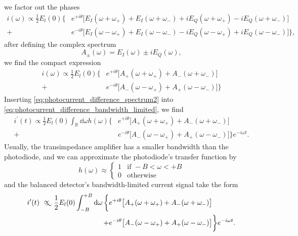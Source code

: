 we factor out the phases
\begin{align*}
    i(\omega)
    \propto
    \frac{1}{2}
    E_l(0)
    \biggl\{
        &e^{+i\theta}
        \bigl[
            E_I(\omega+\omega_+)+E_I(\omega+\omega_-)+iE_Q(\omega+\omega_+)-iE_Q(\omega+\omega_-)
        \bigr]\\
        +
        &e^{-i\theta}
        \bigl[
            E_I(\omega-\omega_+)+E_I(\omega-\omega_-)-iE_Q(\omega-\omega_+)+iE_Q(\omega-\omega_-)
        \bigr]
    \biggr\},
\end{align*}
after defining the complex spectrum
\begin{equation}
    A_\pm(\omega)
    =
    E_I(\omega)\pm iE_Q(\omega)
    \label{eq:aux_spectrum},
\end{equation}
we find the compact expression
\begin{align}
    i(\omega)
    \propto
    \frac{1}{2}E_l(0)
    \biggl\{
        &e^{+i\theta}
        \bigl[
            A_+(\omega+\omega_+)+A_-(\omega+\omega_-)
        \bigr]\\
        +
        &e^{-i\theta}
        \bigl[
            A_-(\omega-\omega_+)+A_+(\omega-\omega_-)
        \bigr]
    \biggr\}
\end{align}
Inserting \cref{eq:photocurrent_difference_spectrum2} into \cref{eq:photocurrent_difference_bandwidth_limited}, we find
\begin{align}
    i^\prime(t)
    \propto
    \frac{1}{2}E_l(0)
    \int_\mathbb{R}\dd{\omega}
    h(\omega)
    \biggl\{
        &e^{+i\theta}
        \bigl[
            A_+(\omega+\omega_+)+A_-(\omega+\omega_-)
        \bigr]\\
        +
        &e^{-i\theta}
        \bigl[
            A_-(\omega-\omega_+)+A_+(\omega-\omega_-)
        \bigr]
    \biggr\}
    e^{-i\omega t}
    \label{eq:photocurrent_difference_spectrum3}.
\end{align}
Usually, the transimpedance amplifier has a smaller bandwidth than the photodiode, and we can approximate the photodiode's transfer function by
\begin{equation}
    h(\omega)
    \approx
    \begin{cases}
        1 & \text{if } -B<\omega<+B\\
        0 & \text{otherwise}
    \end{cases}
\end{equation}
and the balanced detector's bandwidth-limited current signal take the form
\begin{align}
    i^\prime(t)
    \approxprop
    \frac{1}{2}
    E_l(0)
    \int_{-B}^{+B}\dd{\omega}
    \biggl\{
        &e^{+i\theta}
        \bigl[
            A_+(\omega+\omega_+)+A_-(\omega+\omega_-)
        \bigr]\\
        +
        &e^{-i\theta}
        \bigl[
            A_-(\omega-\omega_+)+A_+(\omega-\omega_-)
        \bigr]
    \biggr\}
    e^{-i\omega t}.
\end{align}

